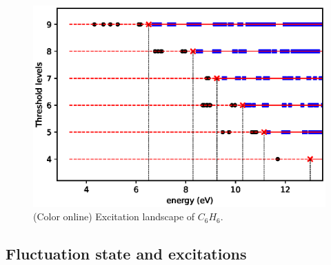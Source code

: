 \documentclass[reprint,aps,prb]{revtex4-1}
\begin{document}
\begin{figure}[ht]
\includegraphics[scale=0.56]{c6h6_excitationLandscape.eps}
\caption{\label{c6h6_excLand}(Color online) Excitation landscape of $C_6H_6$.}
\end{figure}

\subsection{Fluctuation state and excitations}
\end{document}
